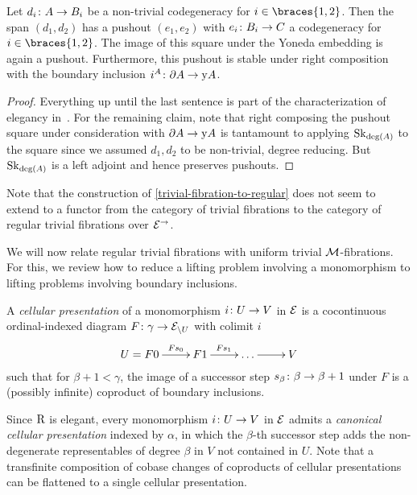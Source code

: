 \documentclass[reqno,10pt,a4paper,oneside,draft]{amsart}
\begin{document}
\begin{lemma}
\label{pushout-non-trivial-deg-boundary}
Let $d_i \co A \to B_i$ be a non-trivial codegeneracy for $i \in \braces{1, 2}$.
Then the span $(d_1, d_2)$ has a pushout $(e_1, e_2)$ with $e_i \co B_i \to C$ a codegeneracy for $i \in \braces{1, 2}$.
The image of this square under the Yoneda embedding is again a pushout.
Furthermore, this pushout is stable under right composition with the boundary inclusion $i^A \co \partial A \to \yon A$.
\end{lemma}

\begin{proof}
Everything up until the last sentence is part of the characterization of elegancy in~\cite[Proposition~3.8]{bergner-rezk-elegant}.
For the remaining claim, note that right composing the pushout square under consideration with $\partial A \to \yon A$ is tantamount to applying $\Sk_{\deg(A)}$ to the square since we assumed $d_1, d_2$ to be non-trivial, \ie degree reducing.
But $\Sk_{\deg(A)}$ is a left adjoint and hence preserves pushouts.
\end{proof}

Note that the construction of \cref{trivial-fibration-to-regular} does not seem to extend to a functor from the category of trivial fibrations to the category of regular trivial fibrations over $\catE^{\to}$.

\medskip

We will now relate regular trivial fibrations with uniform trivial $\cal{M}$-fibrations.
For this, we review how to reduce a lifting problem involving a monomorphism to lifting problems involving boundary inclusions.

\begin{definition}
A \emph{cellular presentation} of a monomorphism $i \co U \to V$ in $\catE$ is a cocontinuous ordinal-indexed diagram $F \co \gamma \to \catE_{\backslash U}$ with colimit $i$
\[
\xymatrix{
  U = F 0
  \ar[r]^-{F s_0}
&
  F 1
  \ar[r]^{F s_1}
&
  \ldots
  \ar[r]
&
  V
}
\]
such that for $\beta + 1 < \gamma$, the image of a successor step $s_{\beta} \co \beta \to \beta + 1$ under $F$ is a (possibly infinite) coproduct of boundary inclusions.
\end{definition}

Since $\R$ is elegant, every monomorphism $i \co U \to V$ in $\catE$ admits a \emph{canonical cellular presentation} indexed by $\alpha$, in which the $\beta$-th successor step adds the non-degenerate representables of degree $\beta$ in $V$ not contained in $U$.
Note that a transfinite composition of cobase changes of coproducts of cellular presentations can be flattened to a single cellular presentation.
\end{document}
